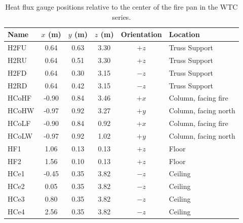 \begin{table}[!h]
\centering
\caption[Heat flux gauge positions relative to the center of the fire pan in the WTC series]
{Heat flux gauge positions relative to the center of the fire pan in the WTC series.}
\begin{tabular}{|l|c|c|c|c|l|}
\hline
Name    & $x$ (m)   & $y$ (m) & $z$ (m)   & Orientation  & Location              \\ \hline \hline
H2FU    & 0.64      & 0.63    & 3.30      &     $+z$     & Truss Support         \\ \hline
H2RU    & 0.64      & 0.51    & 3.30      &     $+z$     & Truss Support         \\ \hline
H2FD    & 0.64      & 0.30    & 3.15      &     $-z$     & Truss Support         \\ \hline
H2RD    & 0.64      & 0.42    & 3.15      &     $-z$     & Truss Support         \\ \hline
HCoHF   & -0.90     & 0.84    & 3.46      &     $+x$     & Column, facing fire   \\ \hline
HCoHW   & -0.97     & 0.92    & 3.27      &     $+y$     & Column, facing north  \\ \hline
HCoLF   & -0.90     & 0.84    & 0.92      &     $+x$     & Column, facing fire   \\ \hline
HCoLW   & -0.97     & 0.92    & 1.02      &     $+y$     & Column, facing north  \\ \hline
HF1     & 1.06      & 0.13    & 0.13      &     $+z$     & Floor                 \\ \hline
HF2     & 1.56      & 0.10    & 0.13      &     $+z$     & Floor                 \\ \hline
HCe1    & -0.45     & 0.35    & 3.82      &     $-z$     & Ceiling               \\ \hline
HCe2    &  0.05     & 0.35    & 3.82      &     $-z$     & Ceiling               \\ \hline
HCe3    &  0.80     & 0.35    & 3.82      &     $-z$     & Ceiling               \\ \hline
HCe4    &  2.56     & 0.35    & 3.82      &     $-z$     & Ceiling               \\ \hline
\end{tabular}
\label{WTC_Gauges}
\end{table}

\newpage

